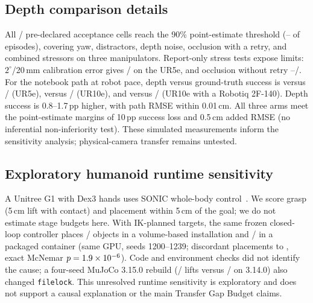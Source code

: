 \documentclass{article}
\newcommand{\pp}{\,pp}
\begin{document}
\subsection{Depth comparison details}
\label{app:depth}
All \pcBarMet/\pcBarCells{} pre-declared acceptance cells reach the 90\% point-estimate threshold (\pcBarMin--\pcN{} of \pcN{} episodes), covering yaw, distractors, depth noise, occlusion with a retry, and combined stressors on three manipulators.
Report-only stress tests expose limits: $2^\circ$/20\,mm calibration error gives \pcCalibTwoFive/\pcN{} on the UR5e, and occlusion without retry \pcArmMin--\pcArmMax/\pcN{}.
For the notebook path at robot pace, depth versus ground-truth success is \spKFiveDepth{} versus \spKFiveTruth/\spN{} (UR5e), \spKTenDepth{} versus \spKTenTruth/\spN{} (UR10e), and \spKKaiDepth{} versus \spKKaiTruth/\spN{} (UR10e with a Robotiq 2F-140). Depth success is 0.8--1.7\pp{} higher, with path RMSE within 0.01\,cm. All three arms meet the point-estimate margins of 10\pp{} success loss and 0.5\,cm added RMSE (no inferential non-inferiority test). These simulated measurements inform the sensitivity analysis; physical-camera transfer remains untested.

\subsection{Exploratory humanoid runtime sensitivity}
\label{app:g1}
A Unitree G1 with Dex3 hands uses SONIC whole-body control~\citep{sonic2025}. We score grasp (5\,cm lift with contact) and placement within 5\,cm of the goal; we do not estimate stage budgets here.
With IK-planned targets, the same frozen closed-loop controller places \giHostPlace/\giN{} objects in a volume-based installation and \giImgPlace/\giN{} in a packaged container (same GPU, seeds 1200--1239; discordant placements \giOnlyImg{} to \giOnlyHost{}, exact McNemar $p=1.9\times 10^{-6}$). Code and environment checks did not identify the cause; a four-seed MuJoCo 3.15.0 rebuild (\mjGraspNew/\mjNNew{} lifts versus \mjGraspOld/\mjNOld{} on 3.14.0) also changed \texttt{filelock}. This unresolved runtime sensitivity is exploratory and does not support a causal explanation or the main Transfer Gap Budget claims.
\end{document}
